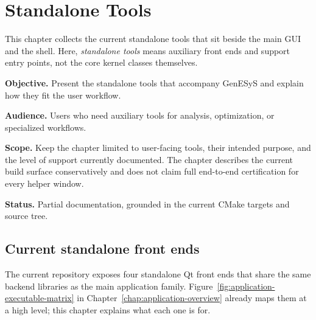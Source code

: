 \chapter{Standalone Tools}
\label{chap:standalone-tools}

This chapter collects the current standalone tools that sit beside the main
GUI and the shell. Here, \textit{standalone tools} means auxiliary front ends
and support entry points, not the core kernel classes themselves.

\noindent\textbf{Objective.} Present the standalone tools that accompany GenESyS and explain how they fit the user workflow.

\noindent\textbf{Audience.} Users who need auxiliary tools for analysis, optimization, or specialized workflows.

\noindent\textbf{Scope.} Keep the chapter limited to user-facing tools, their intended purpose, and the level of support currently documented. The chapter describes the current build surface conservatively and does not claim full end-to-end certification for every helper window.

\noindent\textbf{Status.} Partial documentation, grounded in the current CMake targets and source tree.

\section{Current standalone front ends}

The current repository exposes four standalone Qt front ends that share the
same backend libraries as the main application family. Figure~\ref{fig:application-executable-matrix}
in Chapter~\ref{chap:application-overview} already maps them at a high level;
this chapter explains what each one is for.

